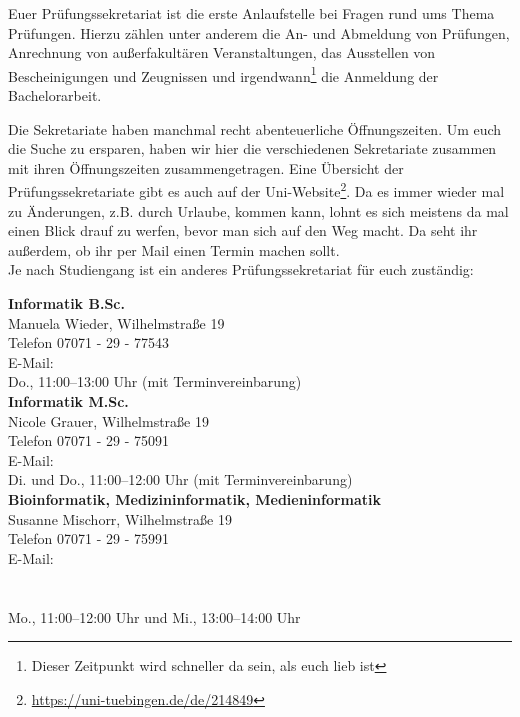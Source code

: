 Euer Prüfungssekretariat ist die erste Anlaufstelle bei Fragen rund ums Thema
Prüfungen. Hierzu zählen unter anderem die An- und Abmeldung von Prüfungen,
Anrechnung von außerfakultären Veranstaltungen, das Ausstellen von
Bescheinigungen und Zeugnissen und irgendwann\footnote{Dieser Zeitpunkt wird
schneller da sein, als euch lieb ist} die Anmeldung der Bachelorarbeit.


Die Sekretariate haben manchmal recht abenteuerliche Öffnungszeiten. Um euch
die Suche zu ersparen, haben wir hier die verschiedenen Sekretariate zusammen
mit ihren Öffnungszeiten zusammengetragen. Eine Übersicht der
Prüfungssekretariate gibt es auch auf der
Uni-Website\footnote{\url{https://uni-tuebingen.de/de/214849}}.
Da es immer wieder mal zu Änderungen, z.B. durch Urlaube, kommen kann,
lohnt es sich meistens da mal einen Blick drauf zu werfen, bevor man sich auf
den Weg macht. Da seht ihr außerdem, ob ihr per Mail einen Termin machen sollt.
\\ %
Je nach Studiengang ist ein anderes Prüfungssekretariat für euch zuständig:


\textbf{Informatik B.Sc.}\\
Manuela Wieder, Wilhelmstraße 19\\
Telefon 07071 - 29 - 77543\\
E-Mail: \\
Do., 11:00--13:00 Uhr (mit Terminvereinbarung)\\

\textbf{Informatik M.Sc.}\\
Nicole Grauer, Wilhelmstraße 19\\
Telefon 07071 - 29 - 75091\\
E-Mail: \\
Di. und Do., 11:00--12:00 Uhr (mit Terminvereinbarung)\\

\textbf{Bioinformatik, Medizininformatik, Medieninformatik}\\
Susanne Mischorr, Wilhelmstraße 19\\
Telefon 07071 - 29 - 75991\\
E-Mail: \\
\hphantom{E-Mail: }\\
\hphantom{E-Mail: } \\
Mo., 11:00--12:00 Uhr und Mi., 13:00--14:00 Uhr\\


